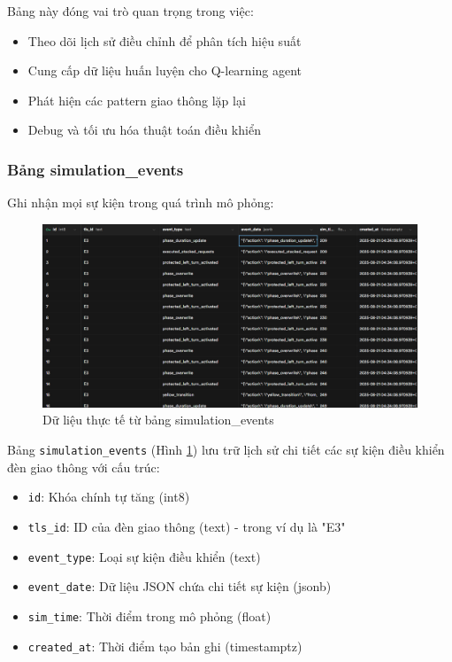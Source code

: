 Bảng này đóng vai trò quan trọng trong việc:
\begin{itemize}
    \item Theo dõi lịch sử điều chỉnh để phân tích hiệu suất
    \item Cung cấp dữ liệu huấn luyện cho Q-learning agent
    \item Phát hiện các pattern giao thông lặp lại
    \item Debug và tối ưu hóa thuật toán điều khiển
\end{itemize}

\subsubsection{Bảng simulation\_events}

Ghi nhận mọi sự kiện trong quá trình mô phỏng:

\begin{figure}[H]
    \centering
    \includegraphics[width=1\linewidth]{TUTU.png}
    \caption{Dữ liệu thực tế từ bảng simulation\_events}
    \label{fig:simulation_events_data}
\end{figure}

Bảng \texttt{simulation\_events} (Hình \ref{fig:simulation_events_data}) lưu trữ lịch sử chi tiết các sự kiện điều khiển đèn giao thông với cấu trúc:

\begin{itemize}
    \item \texttt{id}: Khóa chính tự tăng (int8)
    \item \texttt{tls\_id}: ID của đèn giao thông (text) - trong ví dụ là "E3"
    \item \texttt{event\_type}: Loại sự kiện điều khiển (text)
    \item \texttt{event\_date}: Dữ liệu JSON chứa chi tiết sự kiện (jsonb)
    \item \texttt{sim\_time}: Thời điểm trong mô phỏng (float)
    \item \texttt{created\_at}: Thời điểm tạo bản ghi (timestamptz)
\end{itemize}

